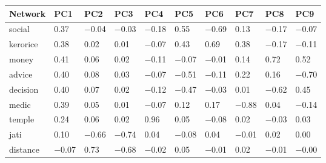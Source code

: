 \begin{table}
\centering
\begin{tabular}[t]{llllllllll}
\toprule
Network & PC1 & PC2 & PC3 & PC4 & PC5 & PC6 & PC7 & PC8 & PC9\\
\midrule
social & \num{0.37} & \num{-0.04} & \num{-0.03} & \num{-0.18} & \num{0.55} & \num{-0.69} & \num{0.13} & \num{-0.17} & \num{-0.07}\\
kerorice & \num{0.38} & \num{0.02} & \num{0.01} & \num{-0.07} & \num{0.43} & \num{0.69} & \num{0.38} & \num{-0.17} & \num{-0.11}\\
money & \num{0.41} & \num{0.06} & \num{0.02} & \num{-0.11} & \num{-0.07} & \num{-0.01} & \num{0.14} & \num{0.72} & \num{0.52}\\
advice & \num{0.40} & \num{0.08} & \num{0.03} & \num{-0.07} & \num{-0.51} & \num{-0.11} & \num{0.22} & \num{0.16} & \num{-0.70}\\
decision & \num{0.40} & \num{0.07} & \num{0.02} & \num{-0.12} & \num{-0.47} & \num{-0.03} & \num{0.01} & \num{-0.62} & \num{0.45}\\
medic & \num{0.39} & \num{0.05} & \num{0.01} & \num{-0.07} & \num{0.12} & \num{0.17} & \num{-0.88} & \num{0.04} & \num{-0.14}\\
temple & \num{0.24} & \num{0.06} & \num{0.02} & \num{0.96} & \num{0.05} & \num{-0.08} & \num{0.02} & \num{-0.03} & \num{0.03}\\
jati & \num{0.10} & \num{-0.66} & \num{-0.74} & \num{0.04} & \num{-0.08} & \num{0.04} & \num{-0.01} & \num{0.02} & \num{0.00}\\
distance & \num{-0.07} & \num{0.73} & \num{-0.68} & \num{-0.02} & \num{0.05} & \num{-0.01} & \num{0.02} & \num{-0.01} & \num{-0.00}\\
\bottomrule
\end{tabular}
\end{table}

